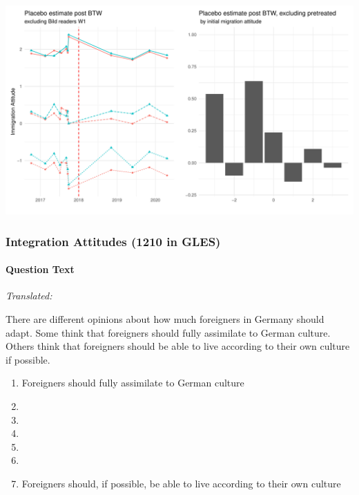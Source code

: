 \documentclass[
]{article}
\providecommand{\tightlist}{%
  \setlength{\itemsep}{0pt}\setlength{\parskip}{0pt}}
\begin{document}
\begin{center}\includegraphics{appendix_files/figure-latex/unnamed-chunk-1-1} \end{center}

\hypertarget{integration-attitudes-1210-in-gles}{%
\subsubsection{Integration Attitudes (1210 in GLES)}\label{integration-attitudes-1210-in-gles}}

\hypertarget{question-text-1}{%
\paragraph{Question Text}\label{question-text-1}}

\emph{Translated:}

There are different opinions about how much foreigners in Germany should adapt. Some think that foreigners should fully assimilate to German culture. Others think that foreigners should be able to live according to their own culture if possible.

\begin{enumerate}
\def\labelenumi{(\arabic{enumi})}
\tightlist
\item
  Foreigners should fully assimilate to German culture
\item
\item
\item
\item
\item
\item
  Foreigners should, if possible, be able to live according to their own culture
\end{enumerate}
\end{document}
